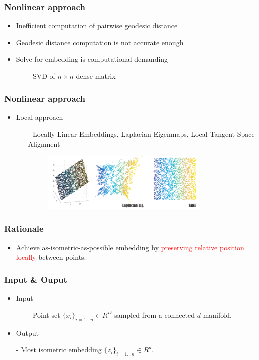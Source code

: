 \documentclass[serif,mathserif, 12pt]{beamer}
\newcommand{\TODO}[1]{\textcolor{red}{#1}}
\begin{document}
\begin{frame}
  \frametitle{Nonlinear approach}
  \begin{itemize}
  \item Inefficient computation of pairwise geodesic distance
  \item Geodesic distance computation is not accurate enough
  \item Solve for embedding is computational demanding
    \begin{itemize}
    \item[-] SVD of $n\times n$ dense matrix
    \end{itemize}
  \end{itemize}
\end{frame}

\begin{frame}
  \frametitle{Nonlinear approach}
  \begin{itemize}
  \item Local approach
    \begin{itemize}
    \item[-] Locally Linear Embeddings, Laplacian Eigenmaps, Local Tangent Space Alignment
      \begin{figure}
        \centering
        \includegraphics[width=0.8\textwidth]{img/affine_precision}
      \end{figure}
    \end{itemize}
  \end{itemize}
\end{frame}

\begin{frame}
  \frametitle{Rationale}
  \begin{itemize}
  \item Achieve as-isometric-as-possible embedding by \TODO{preserving relative position locally}
    between points.
  \end{itemize}
\end{frame}

\begin{frame}
  \frametitle{Input \& Ouput}
  \begin{itemize}
  \item Input
    \begin{itemize}
    \item[-] Point set $\{x_i\}_{i=1...n} \in R^D$ sampled from a connected $d$-manifold.
    \end{itemize}
  \item Output
    \item[-] Most isometric embedding $\{z_i\}_{i=1\dots n} \in R^d$.
  \end{itemize}
\end{frame}
\end{document}
